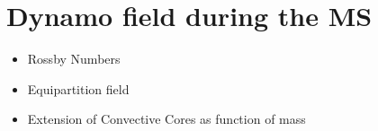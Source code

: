 \section{Dynamo field during the MS}
\begin{itemize}
\item Rossby Numbers
\item Equipartition field
\item Extension of Convective Cores as function of mass
\end{itemize}